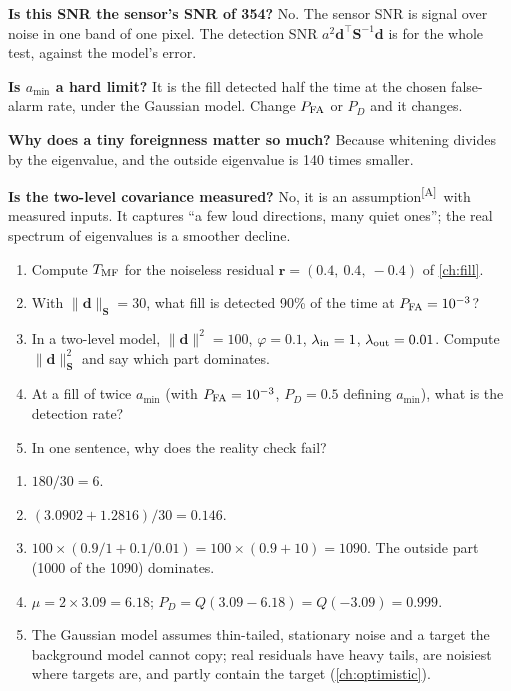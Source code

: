 \documentclass[11pt,a4paper,oneside,openany]{book}
\newcommand{\B}[1]{{\symbf{#1}}}
\newcommand{\B}[1]{{\bm{#1}}}
\newcommand{\assm}{\textsuperscript{\textsf{\scriptsize[A]}}}
\newcommand{\T}{^{\top}}
\newcommand{\nrm}[1]{\lVert #1\rVert}
\newcommand{\vr}{\B{r}}
\newcommand{\vd}{\B{d}}
\newcommand{\mS}{\B{S}}
\begin{document}
\begin{confusions}
\textbf{Is this SNR the sensor's SNR of 354?} No. The sensor SNR is signal over noise in one band of one pixel. The detection SNR $a^2\vd\T\mS^{-1}\vd$
is for the whole test, against the model's error.

\textbf{Is $a_{\min}$ a hard limit?} It is the fill detected half the time at the chosen false-alarm rate, under the Gaussian model. Change
$P_{\rm FA}$ or $P_D$ and it changes.

\textbf{Why does a tiny foreignness matter so much?} Because whitening divides by the eigenvalue, and the outside eigenvalue is 140 times
smaller.

\textbf{Is the two-level covariance measured?} No, it is an assumption\assm\ with measured inputs. It captures ``a few loud directions, many quiet
ones''; the real spectrum of eigenvalues is a smoother decline.
\end{confusions}

\begin{checkyourself}
\begin{enumerate}
\item Compute $T_{\rm MF}$ for the noiseless residual $\vr=(0.4,\ 0.4,\ -0.4)$ of \cref{ch:fill}.
\item With $\nrm{\vd}_{\mS}=30$, what fill is detected 90\% of the time at $P_{\rm FA}=10^{-3}$?
\item In a two-level model, $\nrm{\vd}^2=100$, $\varphi=0.1$, $\lambda_{\rm in}=1$, $\lambda_{\rm out}=0.01$. Compute $\nrm{\vd}^2_{\mS}$ and say which part dominates.
\item At a fill of twice $a_{\min}$ (with $P_{\rm FA}=10^{-3}$, $P_D=0.5$ defining $a_{\min}$), what is the detection rate?
\item In one sentence, why does the reality check fail?
\end{enumerate}
\end{checkyourself}

\begin{answers}
\begin{enumerate}
\item $180/30=6$.
\item $(3.0902+1.2816)/30=0.146$.
\item $100\times(0.9/1+0.1/0.01)=100\times(0.9+10)=1090$. The outside part (1000 of the 1090) dominates.
\item $\mu=2\times3.09=6.18$; $P_D=Q(3.09-6.18)=Q(-3.09)=0.999$.
\item The Gaussian model assumes thin-tailed, stationary noise and a target the background model cannot copy; real residuals have heavy tails, are
  noisiest where targets are, and partly contain the target (\cref{ch:optimistic}).
\end{enumerate}
\end{answers}
\end{document}
